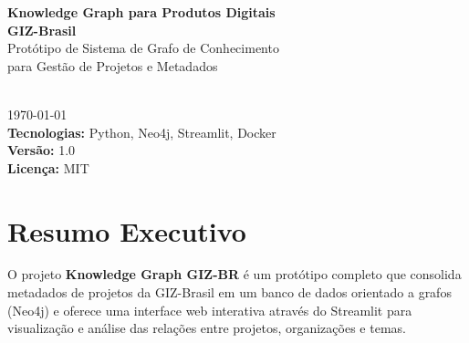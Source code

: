 \documentclass[12pt,a4paper]{article}
\begin{document}
\begin{titlepage}
    \centering
    \vspace*{2cm}
    
    {\huge\bfseries Knowledge Graph para Produtos Digitais}\\[0.5cm]
    {\Large\bfseries GIZ-Brasil}\\[2cm]
    
    {\large Protótipo de Sistema de Grafo de Conhecimento}\\
    {\large para Gestão de Projetos e Metadados}\\[3cm]
    
    \\[2cm]
    
    {\large\today}\\[1cm]
    
    {\normalsize
    \textbf{Tecnologias:} Python, Neo4j, Streamlit, Docker\\
    \textbf{Versão:} 1.0\\
    \textbf{Licença:} MIT
    }
\end{titlepage}

\tableofcontents
\newpage

\section{Resumo Executivo}

O projeto \textbf{Knowledge Graph GIZ-BR} é um protótipo completo que consolida metadados de projetos da GIZ-Brasil em um banco de dados orientado a grafos (Neo4j) e oferece uma interface web interativa através do Streamlit para visualização e análise das relações entre projetos, organizações e temas.
\end{document}
